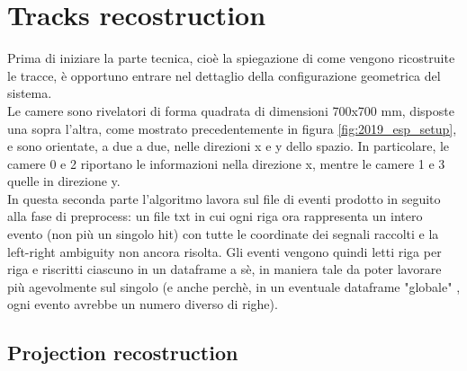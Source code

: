 \documentclass[a4paper,11pt]{book}
\begin{document}
\chapter{Tracks recostruction}

Prima di iniziare la parte tecnica, cioè la spiegazione di come vengono ricostruite le tracce, è opportuno entrare  nel dettaglio della configurazione geometrica del sistema.\\
Le camere sono rivelatori di forma quadrata di dimensioni 700x700 mm, disposte una sopra l'altra, come mostrato precedentemente in figura \ref{fig:2019_esp_setup}, e sono orientate, a due a due, nelle direzioni x e y dello spazio. In particolare, le camere 0 e 2 riportano le informazioni nella direzione x, mentre le camere 1 e 3 quelle in direzione y.\\

In questa seconda parte l'algoritmo lavora sul file di eventi prodotto in seguito alla fase di preprocess: un file txt in cui ogni riga ora rappresenta un intero evento (non più un singolo hit) con tutte le coordinate dei segnali raccolti e la left-right ambiguity non ancora risolta. Gli eventi vengono quindi letti riga per riga e riscritti ciascuno in un dataframe a sè, in maniera tale da poter lavorare più agevolmente sul singolo (e anche perchè, in un eventuale dataframe "globale" , ogni evento avrebbe un numero diverso di righe).\\

\section{Projection recostruction}
\end{document}
